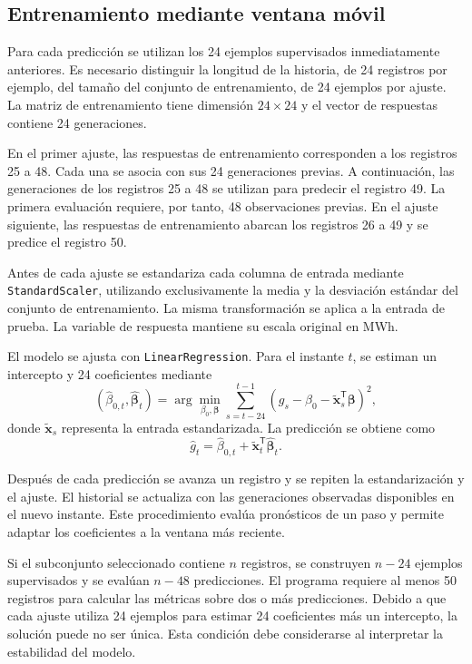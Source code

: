 \subsection{Entrenamiento mediante ventana móvil}

Para cada predicción se utilizan los 24 ejemplos supervisados inmediatamente anteriores. Es necesario distinguir la longitud de la historia, de 24 registros por ejemplo, del tamaño del conjunto de entrenamiento, de 24 ejemplos por ajuste. La matriz de entrenamiento tiene dimensión $24\times24$ y el vector de respuestas contiene 24 generaciones.

En el primer ajuste, las respuestas de entrenamiento corresponden a los registros 25 a 48. Cada una se asocia con sus 24 generaciones previas. A continuación, las generaciones de los registros 25 a 48 se utilizan para predecir el registro 49. La primera evaluación requiere, por tanto, 48 observaciones previas. En el ajuste siguiente, las respuestas de entrenamiento abarcan los registros 26 a 49 y se predice el registro 50.

Antes de cada ajuste se estandariza cada columna de entrada mediante \texttt{StandardScaler}, utilizando exclusivamente la media y la desviación estándar del conjunto de entrenamiento. La misma transformación se aplica a la entrada de prueba. La variable de respuesta mantiene su escala original en MWh.

El modelo se ajusta con \texttt{LinearRegression}. Para el instante $t$, se estiman un intercepto y 24 coeficientes mediante
\begin{equation}
(\hat{\beta}_{0,t},\hat{\boldsymbol{\beta}}_t)
=\arg\min_{\beta_0,\boldsymbol{\beta}}
\sum_{s=t-24}^{t-1}
\left(g_s-\beta_0-\widetilde{\boldsymbol{x}}_s^{\mathsf T}
\boldsymbol{\beta}\right)^2,
\end{equation}
donde $\widetilde{\boldsymbol{x}}_s$ representa la entrada estandarizada. La predicción se obtiene como
\begin{equation}
\hat g_t=\hat{\beta}_{0,t}
+\widetilde{\boldsymbol{x}}_t^{\mathsf T}\hat{\boldsymbol{\beta}}_t.
\end{equation}

Después de cada predicción se avanza un registro y se repiten la estandarización y el ajuste. El historial se actualiza con las generaciones observadas disponibles en el nuevo instante. Este procedimiento evalúa pronósticos de un paso y permite adaptar los coeficientes a la ventana más reciente.

Si el subconjunto seleccionado contiene $n$ registros, se construyen $n-24$ ejemplos supervisados y se evalúan $n-48$ predicciones. El programa requiere al menos 50 registros para calcular las métricas sobre dos o más predicciones. Debido a que cada ajuste utiliza 24 ejemplos para estimar 24 coeficientes más un intercepto, la solución puede no ser única. Esta condición debe considerarse al interpretar la estabilidad del modelo.
